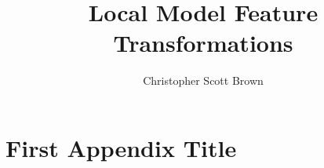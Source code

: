 \documentclass[12pt, lot, lof, los, loa]{southalabamathesis}
\title{Local Model Feature Transformations}
\author{Christopher Scott Brown}
\begin{document}
\makefrontmatter







\appendix

\section{First Appendix Title} \label{appendix:firstappendix}


\makebio
\end{document}
